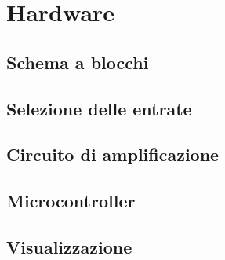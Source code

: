 \chapter{Hardware}
\section{Schema a blocchi}
\section{Selezione delle entrate}
\section{Circuito di amplificazione}
\section{Microcontroller}
\section{Visualizzazione}
